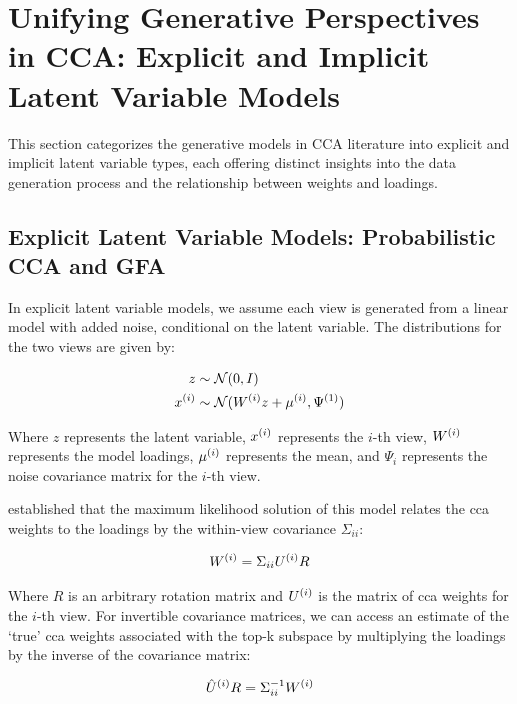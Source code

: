 \section{Unifying Generative Perspectives in CCA: Explicit and Implicit Latent Variable Models}

This section categorizes the generative models in CCA literature into explicit and implicit latent variable types, each offering distinct insights into the data generation process and the relationship between weights and loadings.

\subsection{Explicit Latent Variable Models: Probabilistic CCA and GFA}

In explicit latent variable models, we assume each view is generated from a linear model with added noise, conditional on the latent variable.
The distributions for the two views are given by:

\begin{align}
    z &\sim \mathcal{N}(0, I)\\
    x^{(i)} &\sim \mathcal{N}(W^{(i)} z + \mu^{(i)}, \Psi^{(1)})
\end{align}

Where \(z\) represents the latent variable, \(x^{(i)}\) represents the \(i\)-th view, \(W^{(i)}\) represents the model loadings, \(\mu^{(i)}\) represents the mean, and \(\Psi_{i}\) represents the noise covariance matrix for the \(i\)-th view.

\citet{bach2005probabilistic} established that the maximum likelihood solution of this model relates the \acrshort{cca} weights to the loadings by the within-view covariance \(\Sigma_{ii}\):

\begin{align}\label{eq:weights-to-loadings}
    W^{(i)} = \Sigma_{ii} U^{(i)} R
\end{align}

Where \(R\) is an arbitrary rotation matrix and \(U^{(i)}\) is the matrix of \acrshort{cca} weights for the \(i\)-th view.
For invertible covariance matrices, we can access an estimate of the `true' \acrshort{cca} weights associated with the top-k subspace by multiplying the loadings by the inverse of the covariance matrix:

\begin{align}\label{eq:loadings-to-weights}
    \hat{U}^{(i)}R = \Sigma_{ii}^{-1} W^{(i)}
\end{align}

